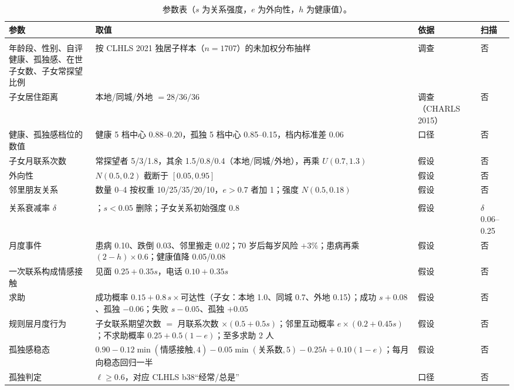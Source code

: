 \documentclass[10.5pt,twocolumn]{ctexart}
\begin{document}
\begin{table}[t]
\centering\footnotesize
\caption{参数表（$s$ 为关系强度，$e$ 为外向性，$h$ 为健康值）。}
\label{tab:params}
\setlength{\tabcolsep}{4pt}
\begin{tabular}{@{}>{\raggedright\arraybackslash}p{}>{\raggedright\arraybackslash}p{}>{\raggedright\arraybackslash}p{}>{\raggedright\arraybackslash}p{}@{}}
\toprule
参数 & 取值 & 依据 & 扫描 \\
\midrule
\multicolumn{4}{@{}l}{\textit{画像生成}} \\
年龄段、性别、自评健康、孤独感、在世子女数、子女常探望比例 & 按 CLHLS 2021 独居子样本（$n=1707$）的未加权分布抽样 & 调查 & 否 \\
子女居住距离 & 本地/同城/外地 $=28/36/36$ & 调查（CHARLS 2015） & 否 \\
健康、孤独感档位的数值 & 健康 5 档中心 0.88--0.20，孤独 5 档中心 0.85--0.15，档内标准差 0.06 & 口径 & 否 \\
子女月联系次数 & 常探望者 5/3/1.8，其余 1.5/0.8/0.4（本地/同城/外地），再乘 $U(0.7,1.3)$ & 假设 & 否 \\
外向性 & $N(0.5,0.2)$ 截断于 $[0.05,0.95]$ & 假设 & 否 \\
邻里朋友关系 & 数量 0--4 按权重 10/25/35/20/10，$e>0.7$ 者加 1；强度 $N(0.5,0.18)$ & 假设 & 否 \\
\midrule
\multicolumn{4}{@{}l}{\textit{环境动力学}} \\
关系衰减率 $\delta$ & 0.06；$s<0.05$ 删除；子女关系初始强度 0.8 & 假设 & $\delta$ 0.06--0.25 \\
月度事件 & 患病 0.10、跌倒 0.03、邻里搬走 0.02；70 岁后每岁风险 $+3\%$；患病再乘 $(2-h)\times0.6$；健康值降 0.05/0.08 & 假设 & 否 \\
一次联系构成情感接触 & 见面 $0.25+0.35s$，电话 $0.10+0.35s$ & 假设 & 否 \\
求助 & 成功概率 $0.15+0.8\,s\times$可达性（子女：本地 1.0、同城 0.7、外地 0.15）；成功 $s{+}0.08$、孤独 $-0.06$；失败 $s{-}0.05$、孤独 $+0.05$ & 假设 & 否 \\
规则层月度行为 & 子女联系期望次数 $=$ 月联系次数 $\times(0.5+0.5s)$；邻里互动概率 $e\times(0.2+0.45s)$；不求助概率 $0.25+0.5(1-e)$；至多求助 2 人 & 假设 & 否 \\
孤独感稳态 & $0.90-0.12\min(\text{情感接触},4)-0.05\min(\text{关系数},5)-0.25h+0.10(1-e)$；每月向稳态回归一半 & 假设 & 否 \\
孤独判定 & $\ell\ge0.6$，对应 CLHLS b38``经常/总是'' & 口径 & 否 \\

\end{tabular}
\end{table}
\end{document}
